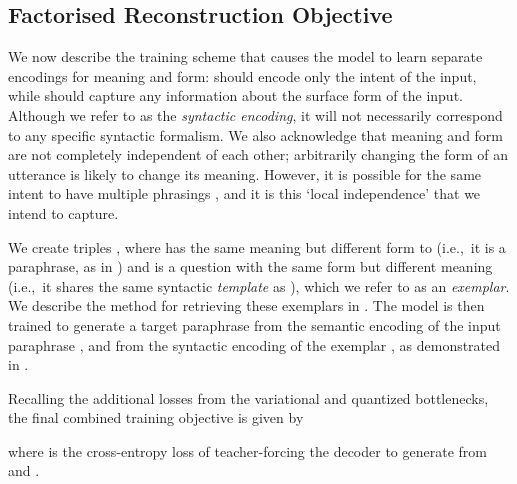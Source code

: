 \documentclass[11pt,a4paper]{article}
\begin{document}
\subsection{Factorised Reconstruction Objective}
\label{sec:training}

We now describe the training scheme that causes the model to learn
separate encodings for meaning and form:  should
encode only the intent of the input, while  should
capture any information about the surface form of the input. Although
we refer to  as the \textit{syntactic encoding}, it
will not necessarily correspond to any specific syntactic
formalism. We also acknowledge that meaning and form are not
completely independent of each other; arbitrarily changing the form of
an utterance is likely to change its meaning. However, it is possible
for the same intent to have multiple phrasings , and it is this `local
independence' that we intend to capture.

We create triples , where  has the same meaning but
different form to  (i.e.,~it is a paraphrase, as in
) and  is a question with the same
form but different meaning (i.e.,~it shares the same syntactic
\textit{template} as ), which we refer to as an
\textit{exemplar}. We describe the method for retrieving these
exemplars in . The model is then trained to
generate a target paraphrase  from the semantic encoding
 of the input paraphrase , and
from the syntactic encoding  of the exemplar
, as demonstrated in .

Recalling the additional losses from the variational and quantized
bottlenecks, the final combined training objective is given by

where  is the cross-entropy loss of teacher-forcing the decoder to generate  from  and  .
\end{document}
